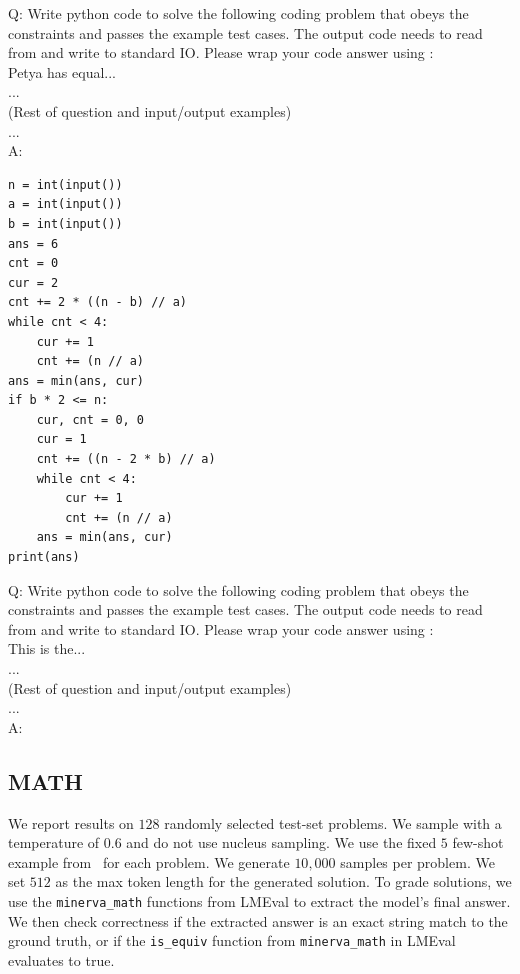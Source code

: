 \documentclass[11pt]{article}
\begin{document}
\begin{tcolorbox}[
    colback=gray!5,
    colframe=gray!75,
    title=Few-Shot Example,
    fonttitle=\bfseries
]
Q: Write python code to solve the following coding problem that obeys the constraints and passes the example test cases. The output code needs to read from and write to standard IO. Please wrap your code answer using \textasciigrave \textasciigrave \textasciigrave:\\
Petya has equal...\\
...\\
(Rest of question and input/output examples)\\
...\\
A: \textasciigrave \textasciigrave \textasciigrave
\begin{verbatim}
n = int(input())
a = int(input())
b = int(input())
ans = 6
cnt = 0
cur = 2
cnt += 2 * ((n - b) // a)
while cnt < 4:
    cur += 1
    cnt += (n // a)
ans = min(ans, cur)
if b * 2 <= n:
    cur, cnt = 0, 0
    cur = 1
    cnt += ((n - 2 * b) // a)
    while cnt < 4:
        cur += 1
        cnt += (n // a)
    ans = min(ans, cur)
print(ans)
\end{verbatim}
\textasciigrave \textasciigrave \textasciigrave
\end{tcolorbox}

\begin{tcolorbox}[
    colback=gray!5,
    colframe=gray!75,
    title=Example Prompt,
    fonttitle=\bfseries
]
Q: Write python code to solve the following coding problem that obeys the constraints and passes the example test cases. The output code needs to read from and write to standard IO. Please wrap your code answer using \textasciigrave \textasciigrave \textasciigrave:\\
This is the...\\
...\\
(Rest of question and input/output examples)\\
...\\
A:
\end{tcolorbox}



\subsection{MATH} We report results on $128$ randomly selected test-set problems. We sample with a temperature of $0.6$ and do not use nucleus sampling. We use the fixed $5$ few-shot example from~\cite{lewkowycz2022solvingquantitativereasoningproblems} for each problem.  We generate $10,000$ samples per problem. We set $512$ as the max token length for the generated solution. To grade solutions, we use the \verb|minerva_math| functions from LMEval \cite{eval-harness} to extract the model's final answer. We then check correctness if the extracted answer is an exact string match to the ground truth, or if the \verb|is_equiv| function from \verb|minerva_math| in LMEval evaluates to true. 
\end{document}
